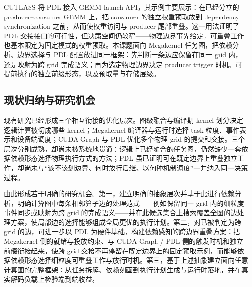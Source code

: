 CUTLASS 将 PDL 接入 GEMM launch API，其示例主要展示：在已经分立的 producer--consumer GEMM 上，把 consumer 的独立权重预取放到 dependency synchronization 之前，从而使权重访问与 producer 尾部重叠\cite{nvidia2026cutlassDependentLaunch,nvidia2026cutlassExample63}。这一用法证明了 PDL 交接接口的可行性，但决策空间仍较窄——物理边界事先给定，可重叠工作也基本限定为固定模式的权重预取。本课题面向 Megakernel 任务图，把依赖分析、边界选择与 PDL 配置放进同一框架：先判断一条边应保留在同一 grid 内，还是映射为跨 grid 完成语义；再为选定物理边界决定 producer trigger 时机、可提前执行的独立前缀形态，以及预取量与存储层级。

\subsection{现状归纳与研究机会}

现有研究已经形成三个相互衔接的优化层次。图级融合与编译期 kernel 划分决定逻辑计算被切成哪些 kernel；Megakernel 编译器与运行时选择 task 粒度、事件表示和设备端调度；CUDA Graph 与 PDL 优化多个物理 grid 的提交和交接。三个层次分别成熟，却尚未被系统地贯通：逻辑上已经融合的任务图，仍然缺少一套依据依赖形态选择物理执行方式的方法；PDL 虽已证明可在既定边界上重叠独立工作，却尚未与“该不该划边界、何时放行后继、以何种机制调度”一并纳入同一决策过程。

由此形成若干明确的研究机会。第一，建立明确的抽象层次并基于此进行依赖分析，明确计算图中每条相邻算子边的处理范式——例如保留同一 grid 内的细粒度事件同步或映射为跨 grid 的完成语义——并在此候选集合上搜索覆盖全图的边处理方案，使局部边的选择能够组成全局更优的执行计划。第二，对已被判定为跨 grid 的边，可进一步以 PDL 为硬件基础，构建依赖感知的跨边界重叠方案：把 Megakernel 侧的就绪与投放约束、与 CUDA Graph / PDL 侧的触发时机和独立前缀衔接起来，使跨 grid 交接不再停留在既定边界上的固定预取示例，而能够依据依赖形态选择细粒度可重叠工作与放行时机。第三，基于上述抽象建立面向任意计算图的完整框架：从任务拆解、依赖刻画到执行计划生成与运行时落地，并在真实解码负载上检验端到端收益。
